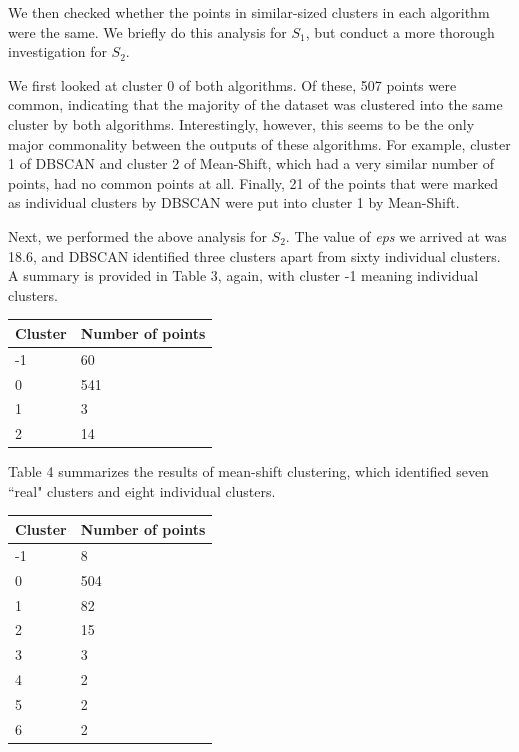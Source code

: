 \documentclass[smallextended]{svjour3}
\begin{document}
	\hfill\break
	
	We then checked whether the points in similar-sized clusters in each algorithm were the same. We briefly do this analysis for $S_1$, but conduct a more thorough investigation for $S_2$.
	
	We first looked at cluster 0 of both algorithms. Of these, 507 points were common, indicating that the majority of the dataset was clustered into the same cluster by both algorithms. Interestingly, however, this seems to be the only major commonality between the outputs of these algorithms. For example, cluster 1 of DBSCAN and cluster 2 of Mean-Shift, which had a very similar number of points, had no common points at all. Finally, 21 of the points that were marked as individual clusters by DBSCAN were put into cluster 1 by Mean-Shift.
	
	Next, we performed the above analysis for $S_2$. The value of \textit{eps} we arrived at was 18.6, and DBSCAN identified three clusters apart from sixty individual clusters. A summary is provided in Table 3, again, with cluster -1 meaning individual clusters.\\
	
	\begingroup
	\endgroup
	\begin{tabular}{ll}
		\hline 
		\textbf{Cluster} & \textbf{Number of points} \\ 
		\hline 
		-1 & 60 \\ 
		\hline 
		0 & 541 \\ 
		\hline 
		1 & 3 \\ 
		\hline 
		2 & 14 \\ 
		\hline 
	\end{tabular} 
	
	\hfill\break
	
	Table 4 summarizes the results of mean-shift clustering, which identified seven ``real" clusters and eight individual clusters.\\
	
	\begin{tabular}{ll}
		\hline 
		\textbf{Cluster} & \textbf{Number of points} \\ 
		\hline 
		-1 & 8 \\ 
		\hline 
		0 & 504 \\ 
		\hline 
		1 & 82 \\ 
		\hline 
		2 & 15 \\ 
		\hline 
		3 & 3 \\ 
		\hline 
		4 & 2 \\ 
		\hline 
		5 & 2 \\ 
		\hline 
		6 & 2 \\ 
		\hline 
	\end{tabular} 
	\begingroup
	\endgroup
	\hfill\break
	
\end{document}
